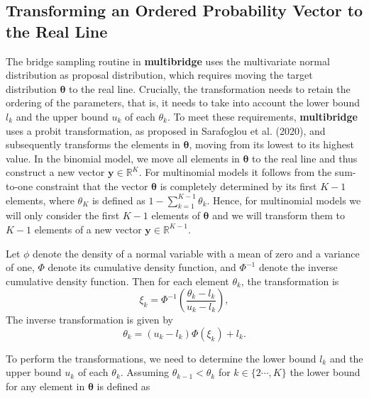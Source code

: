 \clearpage
\makeatletter
\efloat@restorefloats
\makeatother


\begin{appendix}
\hypertarget{transforming-an-ordered-probability-vector-to-the-real-line}{%
\section{Transforming an Ordered Probability Vector to the Real
Line}\label{transforming-an-ordered-probability-vector-to-the-real-line}}

The bridge sampling routine in \textbf{multibridge} uses the
multivariate normal distribution as proposal distribution, which
requires moving the target distribution \(\boldsymbol{\theta}\) to the
real line. Crucially, the transformation needs to retain the ordering of
the parameters, that is, it needs to take into account the lower bound
\(l_k\) and the upper bound \(u_k\) of each \(\theta_k\). To meet these
requirements, \textbf{multibridge} uses a probit transformation, as
proposed in Sarafoglou et al. (2020), and subsequently transforms the
elements in \(\boldsymbol{\theta}\), moving from its lowest to its
highest value. In the binomial model, we move all elements in
\(\boldsymbol{\theta}\) to the real line and thus construct a new vector
\(\boldsymbol{y} \in \mathbb{R}^{K}\). For multinomial models it follows
from the sum-to-one constraint that the vector \(\boldsymbol{\theta}\)
is completely determined by its first \(K - 1\) elements, where
\(\theta_K\) is defined as \(1 - \sum_{k = 1}^{K-1} \theta_k\). Hence,
for multinomial models we will only consider the first \(K - 1\)
elements of \(\boldsymbol{\theta}\) and we will transform them to
\(K - 1\) elements of a new vector
\(\boldsymbol{y} \in \mathbb{R}^{K - 1}\).

Let \(\phi\) denote the density of a normal variable with a mean of zero
and a variance of one, \(\Phi\) denote its cumulative density function,
and \(\Phi^{-1}\) denote the inverse cumulative density function. Then
for each element \(\theta_k\), the transformation is
\[\xi_k = \Phi^{-1}\left(\frac{\theta_k - l_k}{u_k - l_k}\right),\] The
inverse transformation is given by
\[\theta_k = (u_k - l_k) \Phi(\xi_k) + l_k.\]

To perform the transformations, we need to determine the lower bound
\(l_k\) and the upper bound \(u_k\) of each \(\theta_k\). Assuming
\(\theta_{k-1} < \theta_{k}\) for \(k \in \{2 \cdots, K\}\) the lower
bound for any element in \(\boldsymbol{\theta}\) is defined as


\end{appendix}
